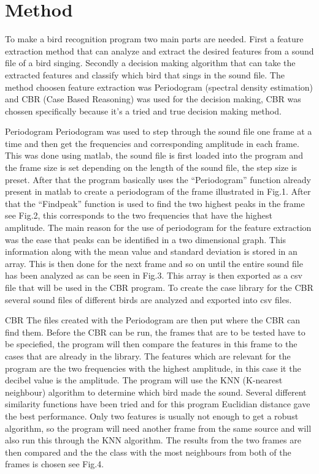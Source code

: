 \section{Method}
To make a bird recognition program two main parts are needed. First a feature extraction method that can analyze and extract the desired features from a sound file of a bird singing. Secondly a decision making algorithm that can take the extracted features and classify which bird that sings in the sound file. The method choosen feature extraction was Periodogram (spectral density estimation) and CBR (Case Based Reasoning) was used for the decision making, CBR was chossen specifically because it’s a tried and true decision making method. 

Periodogram
Periodogram was used to step through the sound file one frame at a time and then get the frequencies and corresponding amplitude in each frame. This was done using matlab, the sound file is first loaded into the program and the frame size is set depending on the length of the sound file, the step size is preset. After that the program basically uses the “Periodogram” function already present in matlab to create a periodogram of the frame illustrated in Fig.1. After that the “Findpeak” function is used to find the two highest peaks in the frame see Fig.2, this corresponds to the two frequencies that have the highest amplitude. The main reason for the use of periodogram for the feature extraction was the ease that peaks can be identified in a two dimensional graph. This information along with the mean value and standard deviation is stored in an array. This is then done for the next frame and so on until the entire sound file has been analyzed as can be seen in Fig.3. This array is then exported as a csv file that will be used in the CBR program. To create the case library for the CBR several sound files of different birds are analyzed and exported into csv files.

CBR
The files created with the Periodogram are then put where the CBR can find them. Before the CBR can be run, the frames that are to be tested have to be speciefied, the program will then compare the features in this frame to the cases that are already in the library. The features which are relevant for the program are the two frequencies with the highest amplitude, in this case it the decibel value is the amplitude. The program will use the KNN (K-nearest neighbour) algorithm to determine which bird made the sound. Several different similarity functions have been tried and for this program Euclidian distance gave the best performance. Only two features is usually not enough to get a robust algorithm, so the program will need another frame from the same source and will also run this through the KNN algorithm. The results from the two frames are then compared and the the class with the most neighbours from both of the frames is chosen see Fig.4.
